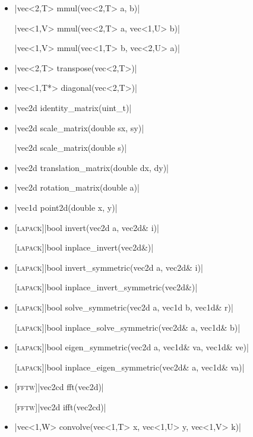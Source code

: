 \documentclass[12pt]{report}
\newcommand{\lapacksym}{\textsc{\small[lapack\small]}}
\newcommand{\lapack}{\lapacksym\hspace{2pt}\xspace}
\newcommand{\fftwsym}{\textsc{[fftw]}}
\newcommand{\fftw}{\fftwsym\hspace{2pt}\xspace}
\begin{document}
\begin{itemize}
\item \cppinline|vec<2,T> mmul(vec<2,T> a, b)| 

\cppinline|vec<1,V> mmul(vec<2,T> a, vec<1,U> b)|

\cppinline|vec<1,V> mmul(vec<1,T> b, vec<2,U> a)|

\item \cppinline|vec<2,T> transpose(vec<2,T>)| 

\item \cppinline|vec<1,T*> diagonal(vec<2,T>)| 

\item \cppinline|vec2d identity_matrix(uint_t)| 

\item \cppinline|vec2d scale_matrix(double sx, sy)| 

\cppinline|vec2d scale_matrix(double s)|

\item \cppinline|vec2d translation_matrix(double dx, dy)| 

\item \cppinline|vec2d rotation_matrix(double a)| 

\item \cppinline|vec1d point2d(double x, y)| 

\item \lapack \cppinline|bool invert(vec2d a, vec2d& i)| 

\lapack \cppinline|bool inplace_invert(vec2d&)| 

\item \lapack \cppinline|bool invert_symmetric(vec2d a, vec2d& i)| 

\lapack \cppinline|bool inplace_invert_symmetric(vec2d&)| 

\item \lapack \cppinline|bool solve_symmetric(vec2d a, vec1d b, vec1d& r)| 

\lapack \cppinline|bool inplace_solve_symmetric(vec2d& a, vec1d& b)| 

\item \lapack \cppinline|bool eigen_symmetric(vec2d a, vec1d& va, vec1d& ve)| 

\lapack \cppinline|bool inplace_eigen_symmetric(vec2d& a, vec1d& va)| 

\item \fftw \cppinline|vec2cd fft(vec2d)| 

\fftw \cppinline|vec2d ifft(vec2cd)| 

\item \cppinline|vec<1,W> convolve(vec<1,T> x, vec<1,U> y, vec<1,V> k)| 

\end{itemize}
\end{document}
